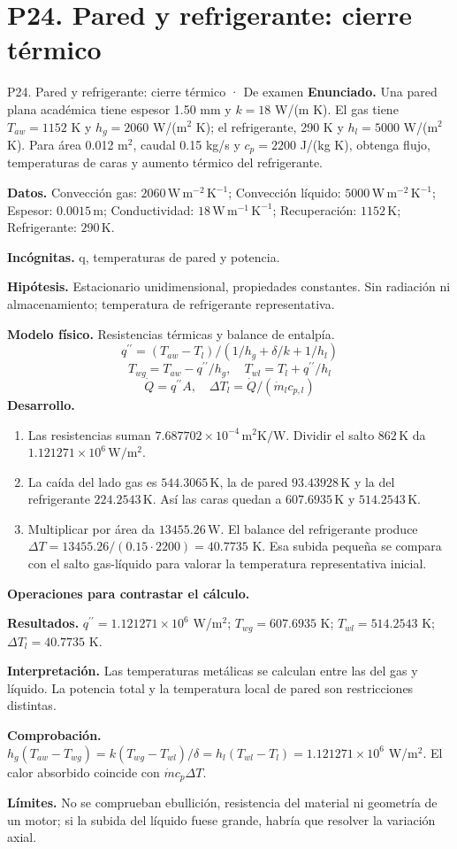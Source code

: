 \section{P24. Pared y refrigerante: cierre térmico}
\begin{studiumworked}{P24. Pared y refrigerante: cierre térmico · De examen}
\textbf{Enunciado.} Una pared plana académica tiene espesor 1.50 mm y $k=18$ W/(m K). El gas tiene $T_{aw}=1152$ K y $h_g=2060$ W/(m$^2$ K); el refrigerante, 290 K y $h_l=5000$ W/(m$^2$ K). Para área 0.012 m$^2$, caudal 0.15 kg/s y $c_p=2200$ J/(kg K), obtenga flujo, temperaturas de caras y aumento térmico del refrigerante.

\textbf{Datos.} Convección gas: $2060\,\mathrm{W\,m^{-2}\,K^{-1}}$; Convección líquido: $5000\,\mathrm{W\,m^{-2}\,K^{-1}}$; Espesor: $0.0015\,\mathrm{m}$; Conductividad: $18\,\mathrm{W\,m^{-1}\,K^{-1}}$; Recuperación: $1152\,\mathrm{K}$; Refrigerante: $290\,\mathrm{K}$.

\textbf{Incógnitas.} q, temperaturas de pared y potencia.

\textbf{Hipótesis.} Estacionario unidimensional, propiedades constantes. Sin radiación ni almacenamiento; temperatura de refrigerante representativa.

\textbf{Modelo físico.} Resistencias térmicas y balance de entalpía.
\[q^{\prime\prime}=(T_{aw}-T_l)/(1/h_g+\delta/k+1/h_l)\]
\[T_{wg}=T_{aw}-q^{\prime\prime}/h_g,\quad T_{wl}=T_l+q^{\prime\prime}/h_l\]
\[\dot Q=q^{\prime\prime}A,\quad \Delta T_l=\dot Q/(\dot m_lc_{p,l})\]
\textbf{Desarrollo.}
\begin{enumerate}
\item Las resistencias suman $7.687702\times10^{-4}\,\mathrm{m^2K/W}$. Dividir el salto $862\,\mathrm{K}$ da $1.121271\times10^{6}\,\mathrm{W/m^2}$.
\item La caída del lado gas es $544.3065\,\mathrm{K}$, la de pared $93.43928\,\mathrm{K}$ y la del refrigerante $224.2543\,\mathrm{K}$. Así las caras quedan a $607.6935\,\mathrm{K}$ y $514.2543\,\mathrm{K}$.
\item Multiplicar por área da $13455.26\,\mathrm{W}$. El balance del refrigerante produce $\Delta T=13455.26/(0.15\cdot2200)=40.7735$ K. Esa subida pequeña se compara con el salto gas-líquido para valorar la temperatura representativa inicial.
\end{enumerate}
\textbf{Operaciones para contrastar el cálculo.}

\textbf{Resultados.} $q^{\prime\prime}=1.121271\times10^{6}$ W/m$^2$; $T_{wg}=607.6935$ K; $T_{wl}=514.2543$ K; $\Delta T_l=40.7735$ K.

\textbf{Interpretación.} Las temperaturas metálicas se calculan entre las del gas y líquido. La potencia total y la temperatura local de pared son restricciones distintas.

\textbf{Comprobación.} $h_g(T_{aw}-T_{wg})=k(T_{wg}-T_{wl})/\delta=h_l(T_{wl}-T_l)=1.121271\times10^{6}$ W/m$^2$. El calor absorbido coincide con $\dot m c_p\Delta T$.

\textbf{Límites.} No se comprueban ebullición, resistencia del material ni geometría de un motor; si la subida del líquido fuese grande, habría que resolver la variación axial.
\end{studiumworked}
